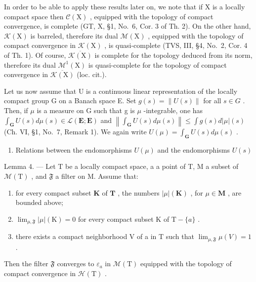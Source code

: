 In order to be able to apply these results later on, we note that if X is a locally compact space then \(\mathcal{C}(\mathrm{X})\) , equipped with the topology of compact convergence, is complete (GT, X, §1, No.~6, Cor. 3 of Th. 2). On the other hand, \(\mathcal{K}(\mathrm{X})\) is barreled, therefore its dual \(\mathcal{M}(\mathrm{X})\) , equipped with the topology of compact convergence in \(\mathcal{K}(\mathrm{X})\) , is quasi-complete (TVS, III, §4, No.~2, Cor. 4 of Th. 1). Of course, \(\overline{\mathcal{K}(\mathrm{X})}\) is complete for the topology deduced from its norm, therefore its dual \(\mathcal{M}^{1}(\mathrm{X})\) is quasi-complete for the topology of compact convergence in \(\overline{\mathcal{K}(\mathrm{X})}\) (loc. cit.).

Let us now assume that U is a continuous linear representation of the locally compact group G on a Banach space E. Set \(g(s) = \|U(s)\|\) for all \(s \in G\) . Then, if \(\mu\) is a measure on G such that g is \(\mu\) -integrable, one has \(\int_{\mathbf{G}} U(s) d\mu(s) \in \mathcal{L}(\mathbf{E}; \mathbf{E})\) and \(\left\|\int_{\mathbf{G}} U(s) d\mu(s)\right\| \leqslant \int g(s) d|\mu|(s)\) (Ch. VI, §1, No.~7, Remark 1). We again write \(U(\mu) = \int_{\mathbf{G}} U(s) d\mu(s)\) .

\begin{enumerate}
\def\labelenumi{\arabic{enumi}.}
\setcounter{enumi}{6}
\tightlist
\item
  Relations between the endomorphisms \(U(\mu)\) and the endomorphisms \(U(s)\)
\end{enumerate}

Lemma 4. --- Let T be a locally compact space, a a point of T, M a subset of \(\mathcal{M}(\mathrm{T})\) , and \(\mathfrak{F}\) a filter on M. Assume that:

\begin{enumerate}
\def\labelenumi{(\roman{enumi})}
\item
  for every compact subset \(\mathbf{K}\) of \(\mathbf{T}\) , the numbers \(|\mu|(\mathbf{K})\) , for \(\mu \in \mathbf{M}\) , are bounded above;
\item
  \(\lim_{\mu, \mathfrak{F}} |\mu| (\mathrm{K}) = 0\) for every compact subset \(\mathrm{K}\) of \(\mathrm{T} - \{a\}\) .
\item
  there exists a compact neighborhood V of a in T such that \(\lim_{\mu, \mathfrak{F}} \mu(V) = 1\) .
\end{enumerate}

Then the filter \(\mathfrak{F}\) converges to \(\varepsilon_{a}\) in \(\mathcal{M}(\mathrm{T})\) equipped with the topology of compact convergence in \(\mathcal{H}(\mathrm{T})\) .

